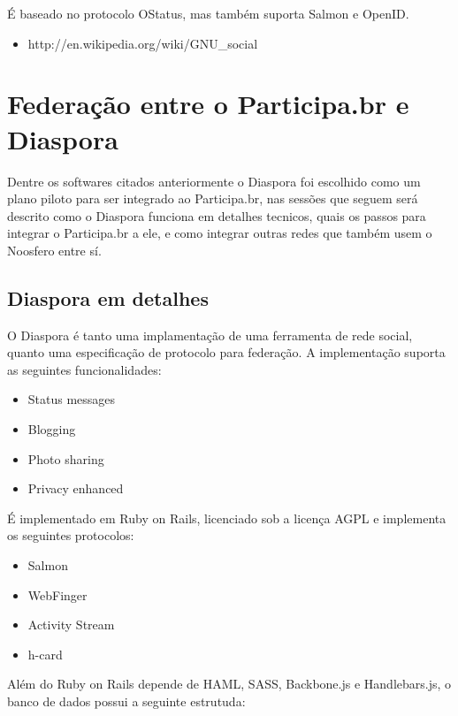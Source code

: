 \documentclass[12pt]{article}
\begin{document}
É baseado no protocolo OStatus, mas também suporta Salmon e OpenID.

\begin{itemize}
  \item http://en.wikipedia.org/wiki/GNU\_social
\end{itemize}

\section{Federação entre o Participa.br e Diaspora}

Dentre os softwares citados anteriormente o Diaspora foi escolhido como um
plano piloto para ser integrado ao Participa.br, nas sessões que seguem será
descrito como o Diaspora funciona em detalhes tecnicos, quais os passos para
integrar o Participa.br a ele, e como integrar outras redes que também usem
o Noosfero entre sí.

\subsection{Diaspora em detalhes}


O Diaspora é tanto uma implamentação de uma ferramenta de rede social, quanto
uma especificação de protocolo para federação. A implementação suporta as
seguintes funcionalidades:

\begin{itemize}
  \item Status messages
  \item Blogging
  \item Photo sharing
  \item Privacy enhanced
\end{itemize}

É implementado em Ruby on Rails, licenciado sob a licença AGPL e implementa os
seguintes protocolos:

\begin{itemize}
  \item Salmon
  \item WebFinger
  \item Activity Stream
  \item h-card
\end{itemize}

Além do Ruby on Rails depende de HAML, SASS, Backbone.js e Handlebars.js, o
banco de dados possui a seguinte estrutuda:
\end{document}

